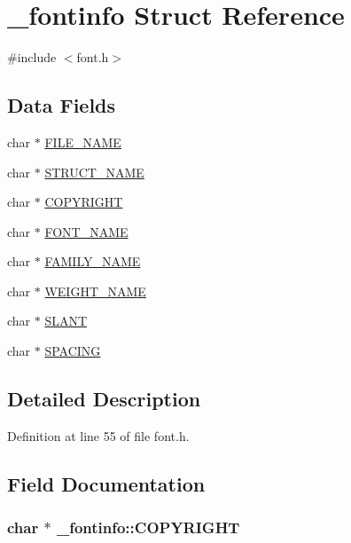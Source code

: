 \hypertarget{struct__fontinfo}{\section{\-\_\-fontinfo Struct Reference}
\label{struct__fontinfo}
}


{\ttfamily \#include $<$font.\-h$>$}

\subsection*{Data Fields}
\begin{DoxyCompactItemize}
\item 
char $\ast$ \hyperlink{struct__fontinfo_a86ca02a864b7dccb21004f51bea22ed3}{F\-I\-L\-E\-\_\-\-N\-A\-M\-E}
\item 
char $\ast$ \hyperlink{struct__fontinfo_a861ecb4b5f190ccd1e71b38270240f86}{S\-T\-R\-U\-C\-T\-\_\-\-N\-A\-M\-E}
\item 
char $\ast$ \hyperlink{struct__fontinfo_a7f4b0949fe49cf3fac04f225e1f36ed2}{C\-O\-P\-Y\-R\-I\-G\-H\-T}
\item 
char $\ast$ \hyperlink{struct__fontinfo_a6c0f76f2668446a1c37ecab8d4e286a5}{F\-O\-N\-T\-\_\-\-N\-A\-M\-E}
\item 
char $\ast$ \hyperlink{struct__fontinfo_a4af43750caadb3ae9d7375f0afdcd171}{F\-A\-M\-I\-L\-Y\-\_\-\-N\-A\-M\-E}
\item 
char $\ast$ \hyperlink{struct__fontinfo_a2f528cb5c1bceb6afd91ad138472d071}{W\-E\-I\-G\-H\-T\-\_\-\-N\-A\-M\-E}
\item 
char $\ast$ \hyperlink{struct__fontinfo_aff56d18df3b46ec10896d15ad3a2e164}{S\-L\-A\-N\-T}
\item 
char $\ast$ \hyperlink{struct__fontinfo_a0e6fafc8f03c70ce9c506d7a506fbba4}{S\-P\-A\-C\-I\-N\-G}
\end{DoxyCompactItemize}


\subsection{Detailed Description}


Definition at line 55 of file font.\-h.



\subsection{Field Documentation}
\hypertarget{struct__fontinfo_a7f4b0949fe49cf3fac04f225e1f36ed2}{
\subsubsection[{C\-O\-P\-Y\-R\-I\-G\-H\-T}]{\setlength{\rightskip}{0pt plus 5cm}char $\ast$ \-\_\-fontinfo\-::\-C\-O\-P\-Y\-R\-I\-G\-H\-T}}\label{struct__fontinfo_a7f4b0949fe49cf3fac04f225e1f36ed2}


